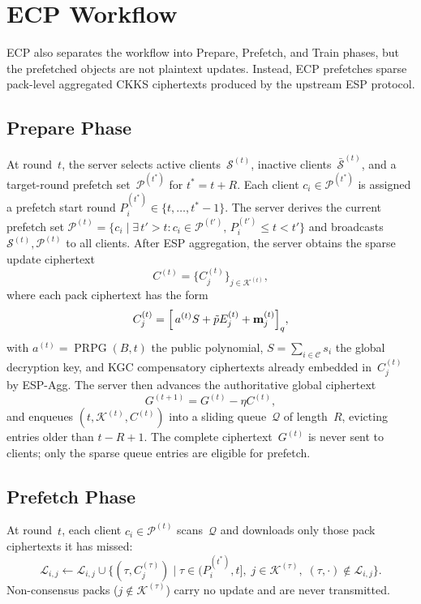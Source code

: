 \documentclass[conference]{IEEEtran}
\DeclareMathOperator{\PRPG}{PRPG}
\begin{document}
\section{ECP Workflow}

ECP also separates the workflow into Prepare, Prefetch, and Train phases, but the prefetched objects are not plaintext updates.
Instead, ECP prefetches sparse pack-level aggregated CKKS ciphertexts produced by the upstream ESP protocol.

\subsection{Prepare Phase}
At round~$t$, the server selects active clients~$\mathcal{S}^{(t)}$, inactive clients~$\bar{\mathcal{S}}^{(t)}$, and a target-round prefetch set~$\mathcal{P}^{(t^*)}$ for $t^*=t+R$.
Each client $c_i\in\mathcal{P}^{(t^*)}$ is assigned a prefetch start round $P_i^{(t^*)}\in\{t,\dots,t^*-1\}$.
The server derives the current prefetch set $\mathcal{P}^{(t)}=\{c_i \mid \exists\, t' > t : c_i \in \mathcal{P}^{(t')},\, P_i^{(t')} \le t < t'\}$ and broadcasts $\mathcal{S}^{(t)},\mathcal{P}^{(t)}$ to all clients.
After ESP aggregation, the server obtains the sparse update ciphertext
\begin{equation}
    C^{(t)} = \bigl\{C_j^{(t)}\bigr\}_{j\in\mathcal{K}^{(t)}},
\end{equation}
where each pack ciphertext has the form
\begin{equation}
    C_j^{(t)} = \Bigl[\, a^{(t)} S + \tilde{p} E_j^{(t)} + \mathbf{m}_j^{(t)} \Bigr]_q,
    \label{eq:ecp-pack}
\end{equation}
with $a^{(t)}=\PRPG(B,t)$ the public polynomial, $S=\sum_{i\in\mathcal{C}} s_i$ the global decryption key, and KGC compensatory ciphertexts already embedded in~$C_j^{(t)}$ by ESP-Agg.
The server then advances the authoritative global ciphertext
\begin{equation}
    G^{(t+1)} = G^{(t)} - \eta C^{(t)},
\end{equation}
and enqueues $(t,\mathcal{K}^{(t)},C^{(t)})$ into a sliding queue~$\mathcal{Q}$ of length~$R$, evicting entries older than $t-R+1$.
The complete ciphertext~$G^{(t)}$ is never sent to clients; only the sparse queue entries are eligible for prefetch.

\subsection{Prefetch Phase}
At round~$t$, each client $c_i \in \mathcal{P}^{(t)}$ scans~$\mathcal{Q}$ and downloads only those pack ciphertexts it has missed:
\begin{equation}
    \mathcal{L}_{i,j} \leftarrow \mathcal{L}_{i,j} \cup \bigl\{(\tau, C_j^{(\tau)}) \mid \tau\in(P_i^{(t^*)},t],\; j\in\mathcal{K}^{(\tau)},\; (\tau,\cdot)\notin\mathcal{L}_{i,j}\bigr\}.
\end{equation}
Non-consensus packs ($j\notin\mathcal{K}^{(\tau)}$) carry no update and are never transmitted.
\end{document}
